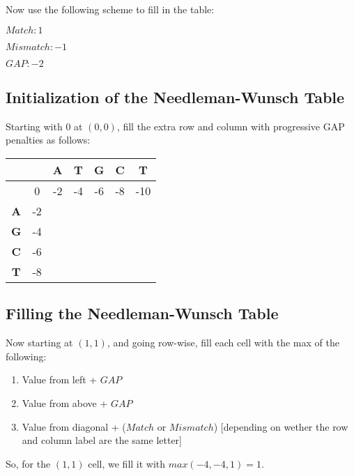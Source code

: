 Now use the following scheme to fill in the table:

$Match: 1$

$Mismatch: -1$

$GAP: -2$

\subsection{Initialization of the Needleman-Wunsch Table}

Starting with 0 at $(0,0)$, fill the extra row and column with progressive GAP penalties as follows:

\begin{table}[htbp]
    \centering
    \begin{tabular}{|c|c|c|c|c|c|c|}
        \hline
          &  & \textbf{A} & \textbf{T} & \textbf{G} & \textbf{C} & \textbf{T} \\
        \hline
        & 0 & -2 & -4 & -6 & -8 & -10 \\
        \hline
        \textbf{A} & -2 &  &  &  &  &  \\
        \hline
        \textbf{G} & -4 &  &  &  &  &  \\
        \hline
        \textbf{C} & -6 &  &  &  &  &  \\
        \hline
        \textbf{T} & -8 &  &  &  &  &  \\
        \hline
    \end{tabular}
\end{table}

\subsection{Filling the Needleman-Wunsch Table}

Now starting at $(1,1)$, and going row-wise, fill each cell with the max of the following:

\begin{enumerate}
    \item Value from left + $GAP$
    
    \item Value from above + $GAP$
    
    \item Value from diagonal + ($Match$ or $Mismatch$) [depending on wether the row and column label are the same letter]

\end{enumerate}

So, for the $(1,1)$ cell, we fill it with $max(-4,-4,1) = 1$.

